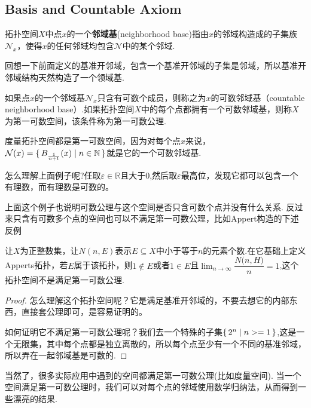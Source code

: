 \subsection{Basis and Countable Axiom}

\begin{definition}
拓扑空间$X$中点$x$的一个\textbf{邻域基}(neighborhood base)指由$x$的邻域构造成的子集族$\mathcal{N}_x$，使得$x$的任何邻域均包含$\mathcal{N}$中的某个邻域.
\end{definition}

回想一下前面定义的基准开邻域，包含一个基准开邻域的子集是邻域，所以基准开邻域结构天然构造了一个领域基.

\begin{definition}
如果点$x$的一个邻域基$\mathcal{N}_x$只含有可数个成员，则称之为$x$的可数邻域基（countable neighborhood base）.如果拓扑空间$X$中的每个点都拥有一个可数邻域基，则称$X$为第一可数空间，该条件称为第一可数公理.
\end{definition}

\begin{example}
度量拓扑空间都是第一可数空间，因为对每个点$x$来说，$\mathcal{N}(x)=\{\,B_{\frac{1}{n+1}}(x)\mid n\in \mathbb{N}\,\}$就是它的一个可数邻域基.
\end{example}

怎么理解上面例子呢?任取$\varepsilon \in \mathbb{R}$且大于0,然后取$\varepsilon$最高位，发现它都可以包含一个有理数，而有理数是可数的。

上面这个例子也说明可数公理与这个空间是否只含可数个点并没有什么关系. 反过来只含有可数多个点的空间也可以不满足第一可数公理，比如Appert构造的下述反例

\begin{example}
让$X$为正整数集，让$N(n,E)$表示$E \subseteq X$中小于等于$n$的元素个数.在它基础上定义Apperts拓扑，若$E$属于该拓扑，则$1 \notin E$或者$1 \in E$且$\displaystyle \lim_{n \mathop \to \infty} \dfrac {{N}{(n, H}) } n = 1$,这个拓扑空间不是满足第一可数公理.
\end{example}

\begin{proof}
怎么理解这个拓扑空间呢？它是满足基准开邻域的，不要去想它的内部东西，直接套公理即可，是容易证明的。

如何证明它不满足第一可数公理呢？我们去一个特殊的子集$\{\,2^n\mid n>=1\,\}$,这是一个无限集，其中每个点都是独立离散的，所以每个点至少有一个不同的基准邻域，所以弄在一起邻域基是可数的.
\end{proof}

当然了，很多实际应用中遇到的空间都满足第一可数公理(比如度量空间). 当一个空间满足第一可数公理时，我们可以对每个点的邻域使用数学归纳法，从而得到一些漂亮的结果.

